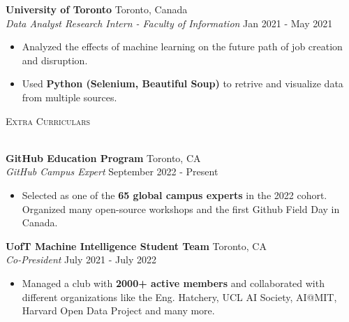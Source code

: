 \documentclass[a4paper]{article}
\newcommand{\lineunder} {
    \vspace*{-8pt} \\
    \hspace*{-18pt} \hrulefill \\
}
\newcommand{\header} [1] {
    {\hspace*{-18pt}\vspace*{6pt} \textsc{#1}}
    \vspace*{-6pt} \lineunder
}
\begin{document}
\textbf{University of Toronto} \hfill Toronto, Canada\\
\textit{Data Analyst Research Intern - Faculty of Information} \hfill Jan 2021 - May 2021\\
\vspace{-3mm}
\begin{itemize} \itemsep 1pt
    \item Analyzed the effects of machine learning on the future path of job creation and disruption.
	\item Used \textbf{Python (Selenium, Beautiful Soup)} to retrive and visualize data from multiple sources.
\end{itemize}


\header{Extra Curriculars}
\vspace{1mm}

\textbf{GitHub Education Program} \hfill Toronto, CA\\
\textit{GitHub Campus Expert} \hfill September 2022 - Present\\
\vspace{-3mm}
\begin{itemize} \itemsep 0.5pt
	\item Selected as one of the \textbf{65 global campus experts} in the 2022 cohort. Organized many open-source workshops and the first Github Field Day in Canada.
\end{itemize}

\textbf{UofT Machine Intelligence Student Team} \hfill Toronto, CA\\
\textit{Co-President} \hfill July 2021 - July 2022\\
\vspace{-3mm}
\begin{itemize} \itemsep 0.5pt
	\item Managed a club with \textbf{2000+ active members} and collaborated with different organizations like the Eng. Hatchery, UCL AI Society, AI@MIT, Harvard Open Data Project and many more.
\end{itemize}
\end{document}
